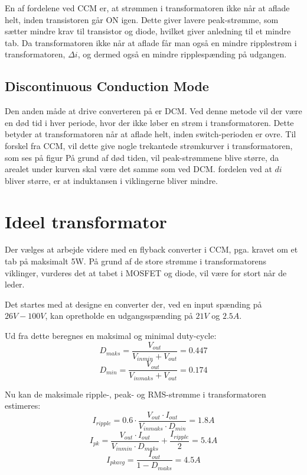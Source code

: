 \noindent En af fordelene ved CCM er, at strømmen i transformatoren ikke når at aflade helt, inden transistoren går ON igen. Dette giver lavere peak-strømme, som sætter mindre krav til transistor og diode, hvilket giver anledning til et mindre tab. Da transformatoren ikke når at aflade får man også en mindre ripplestrøm i transformatoren, $\Delta i$, og dermed også en mindre ripplespænding på udgangen. 

\subsection{Discontinuous Conduction Mode}
Den anden måde at drive converteren på er DCM. Ved denne metode vil der være en død tid i hver periode, hvor der ikke løber en strøm i transformatoren. Dette betyder at transformatoren når at aflade helt, inden switch-perioden er ovre. Til forskel fra CCM, vil dette give nogle trekantede strømkurver i transformatoren, som ses på figur %
På grund af død tiden, vil peak-strømmene blive større, da arealet under kurven skal være det samme som ved DCM. fordelen ved at $di$ bliver større, er at induktansen i viklingerne bliver mindre. 

\section{Ideel transformator}
Der vælges at arbejde videre med en flyback converter i CCM, pga. kravet om et tab på maksimalt 5W. På grund af de store strømme i transformatorens viklinger, vurderes det at tabet i MOSFET og diode, vil være for stort når de leder. 

Det startes med at designe en converter der, ved en input spænding på $26V-100V$, kan opretholde en udgangsspænding på $21V$ og $2.5A$. 

\noindent Ud fra dette beregnes en maksimal og minimal duty-cycle:
\begin{equation} \label{D_maks_CCM}
D_{maks} = \frac{V_{out}}{V_{inmin} + V_{out}} = 0.447
\end{equation}
\begin{equation} \label{D_min_CCM}
D_{min} = \frac{V_{out}}{V_{inmaks} + V_{out}} = 0.174
\end{equation}

\noindent Nu kan de maksimale ripple-, peak- og RMS-strømme i transformatoren estimeres: 
\begin{equation} \label{I_ripple_CCM}
I_{ripple} = 0.6 \cdot \frac{V_{out} \cdot I_{out}}{V_{inmaks} \cdot   D_{min}} = 1.8A
\end{equation}
\begin{equation} \label{I_pk_CCM}
I_{pk} = \frac{V_{out} \cdot I_{out}}{V_{inmin} \cdot D_{maks}} + \frac{I_{ripple}}{2} = 5.4A
\end{equation}
\begin{equation} \label{I_pk_avg_CCM}
I_{pkavg} = \frac{I_{out}}{1-D_{maks}} = 4.5A
\end{equation}


